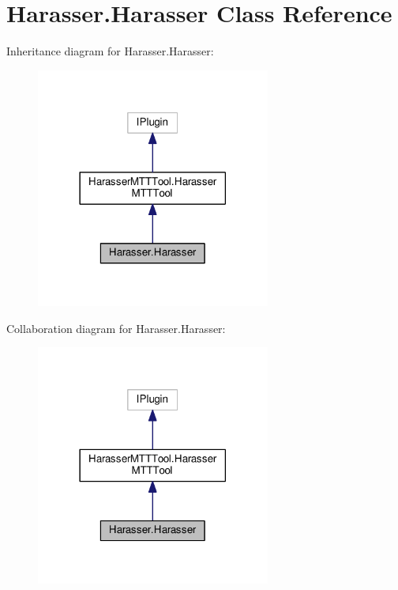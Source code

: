 \hypertarget{classHarasser_1_1Harasser}{\section{Harasser.\-Harasser Class Reference}
\label{classHarasser_1_1Harasser}
}


Inheritance diagram for Harasser.\-Harasser\-:
\nopagebreak
\begin{figure}[H]
\begin{center}
\leavevmode
\includegraphics[width=218pt]{classHarasser_1_1Harasser__inherit__graph}
\end{center}
\end{figure}


Collaboration diagram for Harasser.\-Harasser\-:
\nopagebreak
\begin{figure}[H]
\begin{center}
\leavevmode
\includegraphics[width=218pt]{classHarasser_1_1Harasser__coll__graph}
\end{center}
\end{figure}
